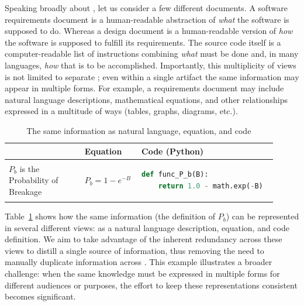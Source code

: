 Speaking broadly about \sfs{}, let us consider a few different documents. A 
software requirements document is a human-readable abstraction of \textit{what} 
the software is supposed to do. Whereas a design document is a human-readable 
version of \textit{how} the software is supposed to fulfill its requirements. 
The source code itself is a computer-readable list of instructions combining 
\textit{what} must be done and, in many languages, \textit{how} that is to be 
accomplished. Importantly, this multiplicity of views is not limited to 
separate \sfs{}; even within a single artifact the same information may appear 
in multiple forms. For example, a requirements document may include natural 
language descriptions, mathematical equations, and other relationships 
expressed in a multitude of ways (tables, graphs, diagrams, etc.).

\begin{table}[h]
\lstset{numbers=none}
\centering
\caption{The same information as natural language, equation, and code}
\label{tab:proj-views}
\begin{tabular}{|p{0.27\linewidth}|p{0.19\linewidth}|p{0.45\linewidth}|}
\hline
\textbf{\rule{0pt}{4.5ex}Description} & 
\textbf{Equation} & 
\textbf{Code (Python)} \\
\hline
\vspace{1.5ex} $P_b$ is the Probability of Breakage &
\vspace{1.5ex} $P_b = 1 - e^{-B}$ &
\begin{minipage}[t]{\linewidth}
\begin{lstlisting}[language=Python,basicstyle=\ttfamily\footnotesize]
def func_P_b(B):
    return 1.0 - math.exp(-B)
\end{lstlisting}
\end{minipage} \\
\hline
\end{tabular}
\end{table}

Table~\ref{tab:proj-views} shows how the same information (the definition of 
$P_b$) can be represented in several different views: as a natural language 
description, equation, and code definition. We aim to take advantage of the 
inherent redundancy across these views to distill a single source of 
information, thus removing the need to manually duplicate information across 
\sfs{}. This example illustrates a broader challenge: when the same knowledge 
must be expressed in multiple forms for different audiences or purposes, the 
effort to keep these representations consistent becomes significant.

